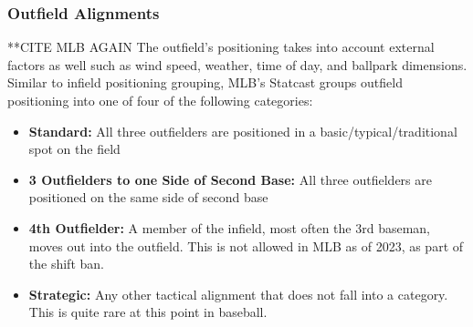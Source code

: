 \documentclass{article}
\begin{document}
\subsubsection{Outfield Alignments}
**CITE MLB AGAIN
The outfield's positioning takes into account external factors as well such as wind speed, weather, time of day, and ballpark dimensions. Similar to infield positioning grouping, MLB's Statcast groups outfield positioning into one of four of the following categories:  

\begin{itemize}
    \item \textbf{Standard:} All three outfielders are positioned in a basic/typical/traditional spot on the field
    \item \textbf{3 Outfielders to one Side of Second Base:} All three outfielders are positioned on the same side of second base
    \item \textbf{4th Outfielder:} A member of the infield, most often the 3rd baseman, moves out into the outfield. This is not allowed in MLB as of 2023, as part of the shift ban. 
    \item \textbf{Strategic:} Any other tactical alignment that does not fall into a category. This is quite rare at this point in baseball. 
\end{itemize}
\end{document}
